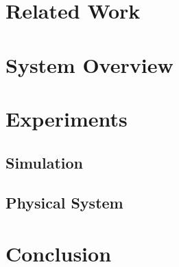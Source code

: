 \documentclass[11pt]{article}
\begin{document}
\section{Related Work}




\section{System Overview}



\section{Experiments}


\subsection{Simulation}

\subsection{Physical System}



\section{Conclusion}




















\end{document}
